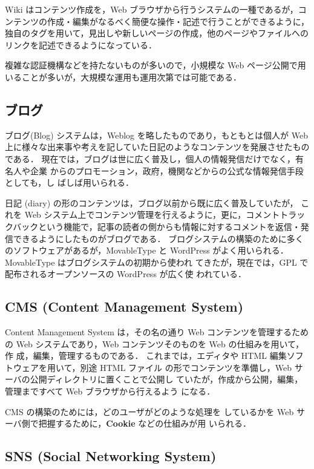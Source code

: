 Wiki はコンテンツ作成を，Web ブラウザから行うシステムの一種であるが，コ
ンテンツの作成・編集がなるべく簡便な操作・記述で行うことができるように，
独自のタグを用いて，見出しや新しいページの作成，他のページやファイルへの
リンクを記述できるようになっている．

複雑な認証機構などを持たないものが多いので，小規模な Web ページ公開で用
いることが多いが，大規模な運用も運用次第では可能である．

\subsection{ブログ}
ブログ(Blog) システムは，Weblog を略したものであり，もともとは個人が Web 
上に様々な出来事や考えを記していた日記のようなコンテンツを発展させたもの
である．
現在では，ブログは世に広く普及し，個人の情報発信だけでなく，有名人や企業
からのプロモーション，政府，機関などからの公式な情報発信手段としても，し
ばしば用いられる．

日記 (diary) の形のコンテンツは，ブログ以前から既に広く普及していたが，
これを Web システム上でコンテンツ管理を行えるように，更に，コメントトラッ
クバックという機能で，記事の読者の側からも情報に対するコメントを返信・発
信できるようにしたものがブログである．
ブログシステムの構築のために多くのソフトウェアがあるが，MovableType と
WordPress がよく用いられる．MovableType はブログシステムの初期から使われ
てきたが，現在では，GPL で配布されるオープンソースの WordPress が広く使
われている．

\subsection{CMS (Content Management System)}
Content Management System は，その名の通り Web コンテンツを管理するため
の Web システムであり，Web コンテンツそのものを Web の仕組みを用いて，作
成，編集，管理するものである．
これまでは，エディタや HTML 編集ソフトウェアを用いて，別途 HTML ファイル
の形でコンテンツを準備し，Web サーバの公開ディレクトリに置くことで公開し
ていたが，作成から公開，編集，管理まですべて Web ブラウザから行えるよう
になる．

CMS の構築のためには，どのユーザがどのような処理を
しているかを Web サーバ側で把握するために，\textbf{Cookie} などの仕組みが用
いられる．

\subsection{SNS (Social Networking System)}

